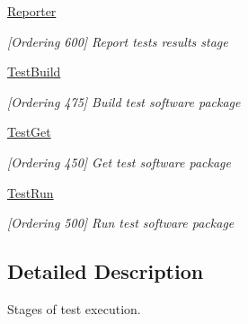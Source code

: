 \begin{DoxyCompactItemize}
\hyperlink{group__Reporter}{Reporter}
\begin{DoxyCompactList}\small\item\em \mbox{[}Ordering 600\mbox{]} Report tests results stage \end{DoxyCompactList}\item 
\hyperlink{group__TestBuild}{Test\-Build}
\begin{DoxyCompactList}\small\item\em \mbox{[}Ordering 475\mbox{]} Build test software package \end{DoxyCompactList}\item 
\hyperlink{group__TestGet}{Test\-Get}
\begin{DoxyCompactList}\small\item\em \mbox{[}Ordering 450\mbox{]} Get test software package \end{DoxyCompactList}\item 
\hyperlink{group__TestRun}{Test\-Run}
\begin{DoxyCompactList}\small\item\em \mbox{[}Ordering 500\mbox{]} Run test software package \end{DoxyCompactList}\end{DoxyCompactItemize}


\subsection{Detailed Description}
Stages of test execution. 